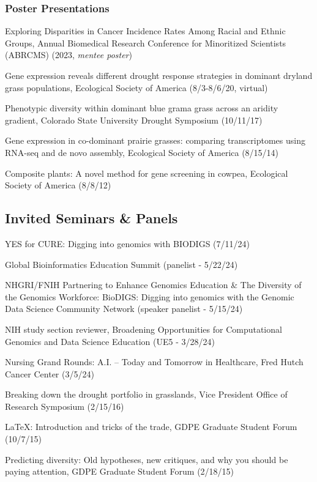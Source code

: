 \documentclass{cv}
\begin{document}
\subsubsection*{Poster Presentations}

Exploring Disparities in Cancer Incidence Rates Among Racial and Ethnic Groups, Annual Biomedical Research Conference for Minoritized Scientists (ABRCMS) (2023, \textit{mentee poster})

Gene expression reveals different drought response strategies in dominant dryland grass populations, Ecological Society of America (8/3-8/6/20, virtual)

Phenotypic diversity within dominant blue grama grass across an aridity gradient, Colorado State University Drought Symposium (10/11/17)

Gene expression in co-dominant prairie grasses: comparing transcriptomes using RNA-seq and de novo assembly, Ecological Society of America (8/15/14)

Composite plants: A novel method for gene screening in cowpea, Ecological Society of America (8/8/12)

\subsection*{Invited Seminars \& Panels}

YES for CURE: Digging into genomics with BIODIGS (7/11/24)

Global Bioinformatics Education Summit (panelist - 5/22/24) %

NHGRI/FNIH Partnering to Enhance Genomics Education \& The Diversity of the Genomics Workforce: BioDIGS: Digging into genomics with the Genomic Data Science Community Network (speaker panelist - 5/15/24)

NIH study section reviewer, Broadening Opportunities for Computational Genomics and Data Science Education (UE5 - 3/28/24)

Nursing Grand Rounds: A.I. – Today and Tomorrow in Healthcare, Fred Hutch Cancer Center (3/5/24)

Breaking down the drought portfolio in grasslands, Vice President Office of Research Symposium (2/15/16)

\LaTeX: Introduction and tricks of the trade, GDPE Graduate Student Forum (10/7/15)

Predicting diversity: Old hypotheses, new critiques, and why you should be paying attention, GDPE Graduate Student Forum (2/18/15)
\end{document}
